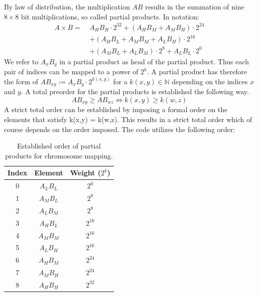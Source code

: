 \documentclass[a4paper,11pt]{article}
\begin{document}
By law of distribution, the multiplication $AB$ results in the summation of nine $8 \times 8$ bit multiplications, so called partial products. In notation:
\begin{equation}
  \begin{split}
    A \times B = \; & A_{H}B_{H} \cdot 2^{32} + (A_{H}B_{M} + A_{M}B_{H}) \cdot 2^{24} \\
                    & + (A_{H}B_{L} + A_{M}B_{M} + A_{L}B_{H}) \cdot 2^{16}            \\
                    & + (A_{M}B_{L} + A_{L}B_{M}) \cdot 2^{8} + A_{L}B_{L} \cdot 2^{0}
  \end{split}
\end{equation}
We refer to $A_{x}B_{y}$ in a partial product as head of the partial product.
Thus each pair of indices can be mapped to a power of $2^{k}$.
A partial product has therefore the form of $AB_{xy} := A_{x}B_{y} \cdot 2^{k(x,y)}$ for a $k(x,y) \in \mathbb{N}$ depending on the indices $x$ and $y$.
A total preorder for the partial products is established the following way.
\begin{equation}
  AB_{xy} \geq AB_{wz} \iff k(x,y) \geq k(w,z)
\end{equation}
A strict total order can be established by imposing a formal order on the elements that satisfy k(x,y) = k(w,z). This results in a strict total order which of course depends on the order imposed. The code utilizes the following order:

\begin{table}[H]
  \centering
  \caption{Established order of partial products for chromosome mapping.}
  \label{tab:partial_products}
  \begin{tabular}{ccc}
    \toprule
    \textbf{Index} & \textbf{Element} & \textbf{Weight ($2^k$)} \\
    \midrule
    0              & $A_{L}B_{L}$     & $2^{0}$                 \\
    1              & $A_{M}B_{L}$     & $2^{8}$                 \\
    2              & $A_{L}B_{M}$     & $2^{8}$                 \\
    3              & $A_{H}B_{L}$     & $2^{16}$                \\
    4              & $A_{M}B_{M}$     & $2^{16}$                \\
    5              & $A_{L}B_{H}$     & $2^{16}$                \\
    6              & $A_{H}B_{M}$     & $2^{24}$                \\
    7              & $A_{M}B_{H}$     & $2^{24}$                \\
    8              & $A_{H}B_{H}$     & $2^{32}$                \\
    \bottomrule
  \end{tabular}
\end{table}
\end{document}
